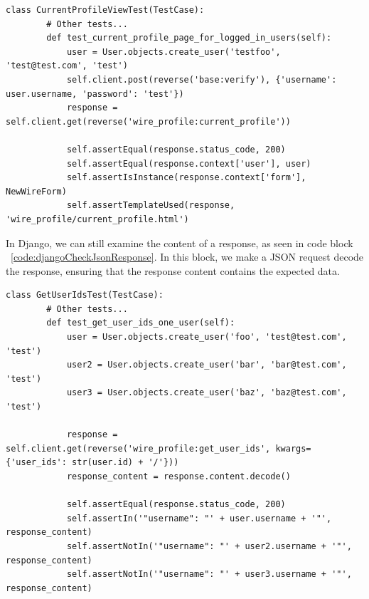 \begin{lstlisting}[caption={Django current profile test},label={code:djangoCurrentProfileTest}]
    class CurrentProfileViewTest(TestCase):
        # Other tests...
        def test_current_profile_page_for_logged_in_users(self):
            user = User.objects.create_user('testfoo', 'test@test.com', 'test')
            self.client.post(reverse('base:verify'), {'username': user.username, 'password': 'test'})
            response = self.client.get(reverse('wire_profile:current_profile'))

            self.assertEqual(response.status_code, 200)
            self.assertEqual(response.context['user'], user)
            self.assertIsInstance(response.context['form'], NewWireForm)
            self.assertTemplateUsed(response, 'wire_profile/current_profile.html')
\end{lstlisting}

In Django, we can still examine the content of a response, as seen in code block ~\ref{code:djangoCheckJsonResponse}.
In this block, we make a JSON request decode the response, ensuring that the response
content contains the expected data.

\begin{lstlisting}[caption={Django checking a JSON response test},label={code:djangoCheckJsonResponse}]
    class GetUserIdsTest(TestCase):
        # Other tests...
        def test_get_user_ids_one_user(self):
            user = User.objects.create_user('foo', 'test@test.com', 'test')
            user2 = User.objects.create_user('bar', 'bar@test.com', 'test')
            user3 = User.objects.create_user('baz', 'baz@test.com', 'test')

            response = self.client.get(reverse('wire_profile:get_user_ids', kwargs={'user_ids': str(user.id) + '/'}))
            response_content = response.content.decode()

            self.assertEqual(response.status_code, 200)
            self.assertIn('"username": "' + user.username + '"', response_content)
            self.assertNotIn('"username": "' + user2.username + '"', response_content)
            self.assertNotIn('"username": "' + user3.username + '"', response_content)
\end{lstlisting}
